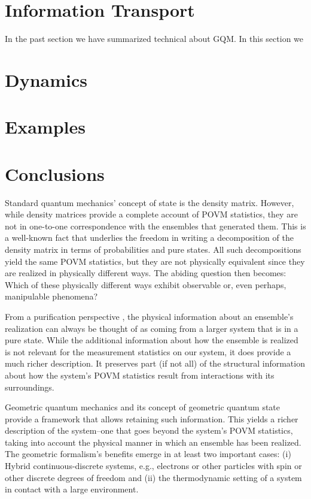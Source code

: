 \documentclass[draft,nofootinbib,pre,twocolumn,showpacs,showkeys,preprintnumbers,floatfix]{revtex4-1}
\newcommand{\1}{\mathbbm{1}}
\begin{document}
\section{Information Transport}
\label{sec:IT}

In the past section we have summarized technical about GQM. In this 
section we 

\section{Dynamics}
\label{sec:DYN}

\section{Examples}
\label{sec:EXAMPLES}

\section{Conclusions}
\label{sec:FINAL}

Standard quantum mechanics' concept of state is the density matrix. However,
while density matrices provide a complete account of POVM statistics, they are
not in one-to-one correspondence with the ensembles that generated them. This
is a well-known fact that underlies the freedom in writing a decomposition of
the density matrix in terms of probabilities and pure states.  All such
decompositions yield the same POVM statistics, but they are not physically
equivalent since they are realized in physically different ways. The abiding
question then becomes: Which of these physically different ways exhibit
observable or, even perhaps, manipulable phenomena?

From a purification perspective \cite{Wilde2017}, the physical information
about an ensemble's realization can always be thought of as coming from a
larger system that is in a pure state. While the additional information about
how the ensemble is realized is not relevant for the measurement statistics on
our system, it does provide a much richer description. It preserves part (if
not all) of the structural information about how the system's POVM statistics
result from interactions with its surroundings.
 
Geometric quantum mechanics and its concept of geometric quantum state provide
a framework that allows retaining such information. This yields a richer
description of the system--one that goes beyond the system's POVM statistics, 
taking into account the physical manner in which an ensemble has been realized.
The geometric formalism's benefits emerge in at least two important cases:
(i) Hybrid continuous-discrete systems, e.g., electrons or other particles with
spin or other discrete degrees of freedom and (ii) the thermodynamic setting
of a system in contact with a large environment.
\end{document}
